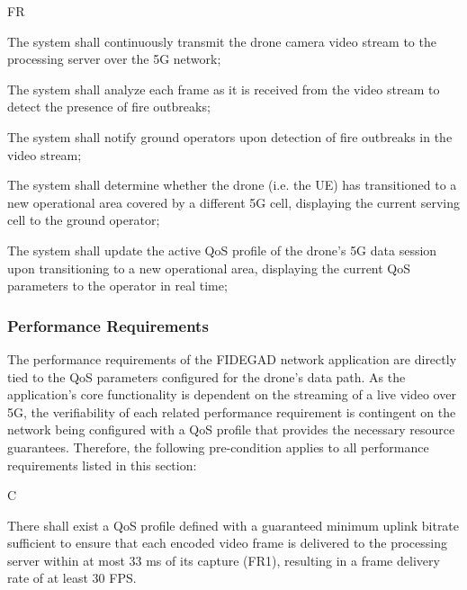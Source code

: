\begin{custenumerate}{FR}
    \item The system shall continuously transmit the drone camera video stream to the processing server over the \acs{5G} network;
    \item The system shall analyze each frame as it is received from the video stream to detect the presence of fire outbreaks;
    \item The system shall notify ground operators upon detection of fire outbreaks in the video stream;
    \item The system shall determine whether the drone (i.e. the \acs{UE}) has transitioned to a new operational area covered by a different \acs{5G} cell, displaying the current serving cell to the ground operator;
    \item The system shall update the active \acs{QoS} profile of the drone's \acs{5G} data session upon transitioning to a new operational area, displaying the current \acs{QoS} parameters to the operator in real time;
\end{custenumerate}

\subsubsection{Performance Requirements}
\label{chap:proposal:netapp:requirements:performance}

The performance requirements of the \acs{FIDEGAD} network application are directly tied to the \acs{QoS} parameters configured for the drone's data path. As the application's core functionality is dependent on the streaming of a live video over \acs{5G}, the verifiability of each related performance requirement is contingent on the network being configured with a \acs{QoS} profile that provides the necessary resource guarantees. Therefore, the following pre-condition applies to all performance requirements listed in this section:

\begin{custenumerate}{C}
    \item There shall exist a \acs{QoS} profile defined with a guaranteed minimum uplink bitrate sufficient to ensure that each encoded video frame is delivered to the processing server within at most 33 ms of its capture (FR1), resulting in a frame delivery rate of at least 30 \acs{FPS}.
\end{custenumerate}

